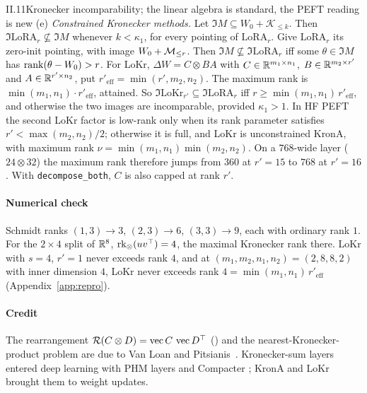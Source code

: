 \begin{theorem}{II.11}{Kronecker incomparability; the linear algebra is standard, the PEFT reading is new}
(e) \emph{Constrained Kronecker methods.} Let $\Im M\subseteq W_0+\mathcal K_{\le k}$. Then
$\Im\mathrm{LoRA}_r\not\subseteq\Im M$ whenever $k<\kappa_1$, for every pointing of $\mathrm{LoRA}_r$. Give
$\mathrm{LoRA}_r$ its zero-init pointing, with image $W_0+\mathcal{M}_{\le r}$. Then $\Im M\not\subseteq\Im\mathrm{LoRA}_r$ iff some
$\theta\in\Im M$ has $\operatorname{rank}(\theta-W_0)>r$. For LoKr, $\Delta W=C\otimes BA$ with $C\in\mathbb{R}^{m_1\times n_1}$,
$B\in\mathbb{R}^{m_2\times r'}$ and $A\in\mathbb{R}^{r'\times n_2}$, put $r'_{\mathrm{eff}}=\min(r',m_2,n_2)$. The maximum rank is
$\min(m_1,n_1)\cdot r'_{\mathrm{eff}}$, attained. So $\Im\mathrm{LoKr}_{r'}\subseteq\Im\mathrm{LoRA}_r$ iff
$r\ge\min(m_1,n_1)\,r'_{\mathrm{eff}}$, and otherwise the two images are incomparable, provided $\kappa_1>1$. In HF PEFT
the second LoKr factor is low-rank only when its rank parameter satisfies $r'<\max(m_2,n_2)/2$; otherwise it is full,
and LoKr is unconstrained KronA, with maximum rank $\nu=\min(m_1,n_1)\min(m_2,n_2)$. On a $768$-wide layer
($24\otimes32$) the maximum rank therefore jumps from $360$ at $r'=15$ to $768$ at $r'=16$. With
\texttt{decompose\_both}, $C$ is also capped at rank $r'$.
\end{theorem}

\paragraph{Numerical check}
Schmidt ranks $(1,3)\to3$, $(2,3)\to6$, $(3,3)\to9$, each with ordinary rank $1$. For the $2\times4$ split of $\mathbb{R}^8$,
$\operatorname{rk}_\otimes(uv^{\top})=4$, the maximal Kronecker rank there. LoKr with $s=4$, $r'=1$ never exceeds rank $4$,
and at $(m_1,m_2,n_1,n_2)=(2,8,8,2)$ with inner dimension $4$, LoKr never exceeds rank
$4=\min(m_1,n_1)\,r'_{\mathrm{eff}}$ (Appendix~\ref{app:repro}).

\paragraph{Credit}
The rearrangement $\mathcal R(C\otimes D)=\operatorname{vec} C\,\operatorname{vec} D^{\top}$ () and the nearest-Kronecker-product problem
are due to Van Loan and Pitsianis~\citeyearpar{loan1993approximation}. Kronecker-sum layers entered deep learning with
PHM layers \citep{zhang2021beyond} and Compacter \citep{mahabadi2021compacter}; KronA \citep{edalati2022krona} and LoKr
\citep{yeh2023navigating} brought them to weight updates.

